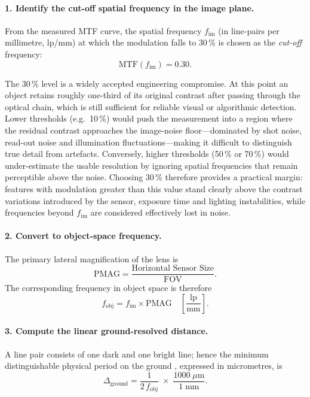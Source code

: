 \paragraph{1. Identify the cut-off spatial frequency in the image plane.}
From the measured MTF curve, the spatial frequency
$f_{\text{im}}$ (in line-pairs per millimetre, lp/mm) at which the modulation falls to
30\,\% is chosen as the \emph{cut-off} frequency:
%
\begin{equation}
    \text{MTF}\!\left(f_{\text{im}}\right)=0.30.
    \label{eq:mtf_cutoff}
\end{equation}

\noindent
The 30\,\% level is a widely accepted engineering compromise.  
At this point an object retains roughly one-third of its original contrast after passing
through the optical chain, which is still sufficient for reliable visual or algorithmic
detection.  
Lower thresholds (e.g.\ 10\,\%) would push the measurement into a region where the
residual contrast approaches the image‐noise floor—dominated by shot noise,
read-out noise and illumination fluctuations—making it difficult to distinguish true
detail from artefacts.  
Conversely, higher thresholds (50\,\% or 70\,\%) would under-estimate the usable
resolution by ignoring spatial frequencies that remain perceptible above the noise.
Choosing 30\,\% therefore provides a practical margin: features with modulation
greater than this value stand clearly above the contrast variations introduced by the
sensor, exposure time and lighting instabilities, while frequencies beyond
$f_{\text{im}}$ are considered effectively lost in noise.

\paragraph{2. Convert to object‑space frequency.}
The primary lateral magnification of the lens is
%
\begin{equation}
    \label{eq:pmag}
    \text{PMAG}= \frac{\text{Horizontal Sensor Size}}{\text{FOV}}.
\end{equation}
%
The corresponding frequency in object space is therefore
%
\begin{equation}
    f_{\text{obj}} = f_{\text{im}} \times \text{PMAG}
    \quad\left[\frac{\text{lp}}{\text{mm}}\right].
    \label{eq:f_obj}
\end{equation}

\paragraph{3. Compute the linear ground-resolved distance.}
A line pair consists of one dark and one bright line; hence the minimum
distinguishable physical period on the ground \cite{HollowsJames_Resolution_EO}, expressed in micrometres, is
%
\begin{equation}
    \Delta_{\text{ground}} =
    \frac{1}{2\,f_{\text{obj}}}\;\times\;
    \frac{1000\;\mu\text{m}}{1\;\text{mm}}.
    \label{eq:delta_ground}
\end{equation}
%

